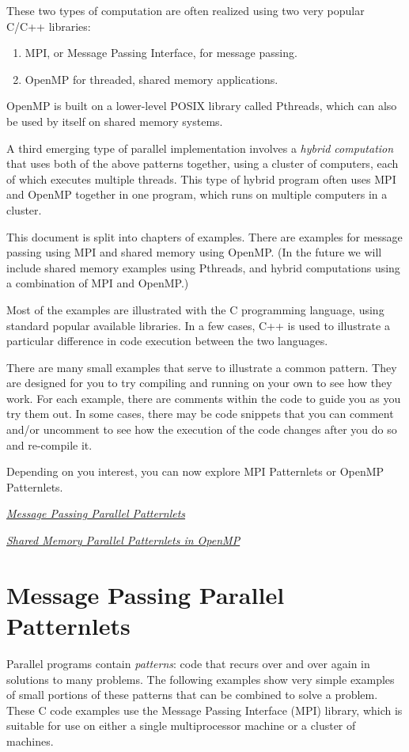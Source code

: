 \documentclass[letterpaper,10pt,openany,oneside]{sphinxmanual}
\begin{document}
These two types of computation are often realized using two very popular C/C++ libraries:
\begin{enumerate}
\item {} 
MPI, or Message Passing Interface, for message passing.

\item {} 
OpenMP for threaded, shared memory applications.

\end{enumerate}

OpenMP is built on a lower-level POSIX library called Pthreads, which can also be used by itself on shared memory systems.

A third emerging type of parallel implementation involves a \emph{hybrid computation} that uses both of the above patterns together, using a cluster of computers, each of which executes multiple threads.  This type of hybrid program often uses MPI and OpenMP together in one program, which runs on multiple computers in a cluster.

This document is split into chapters of examples.  There are examples for message passing using MPI and shared memory using OpenMP.
(In the future we will include shared memory examples using Pthreads, and hybrid computations using a combination of MPI and OpenMP.)

Most of the examples are illustrated
with the C programming language, using standard popular available libraries. In a few cases, C++
is used to illustrate a particular difference in code execution between the two languages.

There are many small examples that serve to illustrate a common pattern.  They are designed for you to try compiling and running on your own to see how they work.  For each example, there are comments within the code to guide you as you try them out.  In some cases, there may be code snippets that you can comment and/or uncomment to see how the execution of the code changes after you do so and re-compile it.

Depending on you interest, you can now explore MPI Patternlets or OpenMP Patternlets.

{\hyperref[MessagePassing/MPI_Patternlets::doc]{\emph{Message Passing Parallel Patternlets}}}

{\hyperref[SharedMemory/OpenMP_Patternlets::doc]{\emph{Shared Memory Parallel Patternlets in OpenMP}}}


\chapter{Message Passing Parallel Patternlets}
\label{MessagePassing/MPI_Patternlets:message-passing-parallel-patternlets}\label{MessagePassing/MPI_Patternlets::doc}
Parallel programs contain \emph{patterns}:  code that recurs over and over again
in solutions to many problems.  The following examples show very simple
examples of small portions of
these patterns that can be combined to solve a problem.  These C code examples use the
Message Passing Interface (MPI) library, which is suitable for use on either a
single multiprocessor machine or a cluster
of machines.
\end{document}
